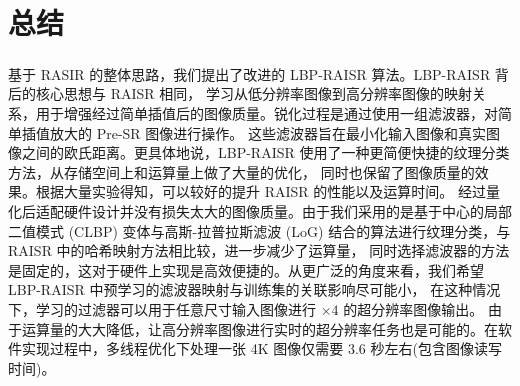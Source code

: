 \documentclass[12pt, a4paper, oneside]{ctexbook}
\begin{document}
	\chapter{总结}
	基于 RASIR\textsuperscript{\cite{1}} 的整体思路，我们提出了改进的 LBP-RAISR 算法。LBP-RAISR 背后的核心思想与 RAISR 相同，
	学习从低分辨率图像到高分辨率图像的映射关系，用于增强经过简单插值后的图像质量。锐化过程是通过使用一组滤波器，对简单插值放大的 Pre-SR 图像进行操作。
	这些滤波器旨在最小化输入图像和真实图像之间的欧氏距离。更具体地说，LBP-RAISR 使用了一种更简便快捷的纹理分类方法，从存储空间上和运算量上做了大量的优化，
	同时也保留了图像质量的效果。根据大量实验得知，可以较好的提升 RAISR 的性能以及运算时间。
	经过量化后适配硬件设计并没有损失太大的图像质量。由于我们采用的是基于中心的局部二值模式 (CLBP) 变体与高斯-拉普拉斯滤波 (LoG) 结合的算法进行纹理分类，与 RAISR 中的哈希映射方法相比较，进一步减少了运算量，
	同时选择滤波器的方法是固定的，这对于硬件上实现是高效便捷的。从更广泛的角度来看，我们希望 LBP-RAISR 中预学习的滤波器映射与训练集的关联影响尽可能小，
	在这种情况下，学习的过滤器可以用于任意尺寸输入图像进行 $\times4$ 的超分辨率图像输出。
	由于运算量的大大降低，让高分辨率图像进行实时的超分辨率任务也是可能的。在软件实现过程中，多线程优化下处理一张 4K 图像仅需要 3.6 秒左右(包含图像读写时间)。
\end{document}
